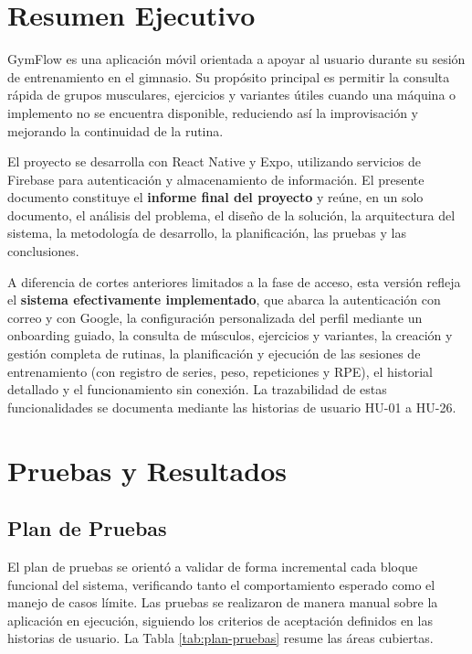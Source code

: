 \documentclass[12pt,letterpaper]{article}
\begin{document}

\clearpage
\tableofcontents
\clearpage

\section{Resumen Ejecutivo}

GymFlow es una aplicación móvil orientada a apoyar al usuario durante su sesión de entrenamiento en el gimnasio. Su propósito principal es permitir la consulta rápida de grupos musculares, ejercicios y variantes útiles cuando una máquina o implemento no se encuentra disponible, reduciendo así la improvisación y mejorando la continuidad de la rutina.

El proyecto se desarrolla con React Native y Expo, utilizando servicios de Firebase para autenticación y almacenamiento de información. El presente documento constituye el \textbf{informe final del proyecto} y reúne, en un solo documento, el análisis del problema, el diseño de la solución, la arquitectura del sistema, la metodología de desarrollo, la planificación, las pruebas y las conclusiones.

A diferencia de cortes anteriores limitados a la fase de acceso, esta versión refleja el \textbf{sistema efectivamente implementado}, que abarca la autenticación con correo y con Google, la configuración personalizada del perfil mediante un onboarding guiado, la consulta de músculos, ejercicios y variantes, la creación y gestión completa de rutinas, la planificación y ejecución de las sesiones de entrenamiento (con registro de series, peso, repeticiones y RPE), el historial detallado y el funcionamiento sin conexión. La trazabilidad de estas funcionalidades se documenta mediante las historias de usuario HU-01 a HU-26.






\section{Pruebas y Resultados}

\subsection{Plan de Pruebas}

El plan de pruebas se orientó a validar de forma incremental cada bloque funcional del sistema, verificando tanto el comportamiento esperado como el manejo de casos límite. Las pruebas se realizaron de manera manual sobre la aplicación en ejecución, siguiendo los criterios de aceptación definidos en las historias de usuario. La Tabla \ref{tab:plan-pruebas} resume las áreas cubiertas.
\end{document}
